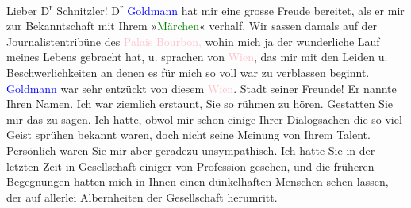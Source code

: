 \pstart{}Lieber D\textsuperscript{r} Schnitzler!\pend\vspace{0.5em}
\pstart
           D\textsuperscript{r}{ }\textcolor{blue}{Goldmann}\ledrightnote{\textcolor{blue}{Paul Goldmann}} hat mir eine grosse Freude bereitet,
               als er mir zur Bekanntschaft mit Ihrem »\textcolor{green}{Märchen}\ledrightnote{\textcolor{green}{Das Märchen. Schauspiel in drei Aufzügen}}«
               verhalf. Wir sassen damals auf der Journalistentribüne des \textcolor{pink}{Palais Bourbon,}\ledrightnote{\textcolor{pink}{Palais Bourbon}} wohin mich ja der wunderliche Lauf meines
               Lebens gebracht hat, u. sprachen von \textcolor{pink}{Wien}\ledrightnote{\textcolor{pink}{Wien}}, das mir
               mit den Leiden u. Beschwerlichkeiten an denen es für mich so voll war zu verblassen
               beginnt. \textcolor{blue}{Goldmann}\ledrightnote{\textcolor{blue}{Paul Goldmann}} war sehr entzückt von diesem
                  \textcolor{pink}{Wien}\ledrightnote{\textcolor{pink}{Wien}}. Stadt seiner Freunde! Er nannte Ihren
               Namen. Ich war ziemlich erstaunt, Sie so rühmen zu hören. Gestatten Sie mir das zu
               sagen. Ich hatte, obwol mir {\pb}schon
               einige Ihrer Dialogsachen die so viel Geist sprühen bekannt waren, doch nicht seine
               Meinung von Ihrem Talent. Persönlich waren Sie mir aber geradezu unsympathisch. Ich
               hatte Sie in der letzten Zeit in Gesellschaft einiger \label{K_L03823-1v}\label{K_L03823-1} von Profession gesehen, und die früheren Begegnungen hatten mich in Ihnen
               einen dünkelhaften Menschen sehen lassen, der auf allerlei Albernheiten der
               Gesellschaft herumritt.\pend
           
